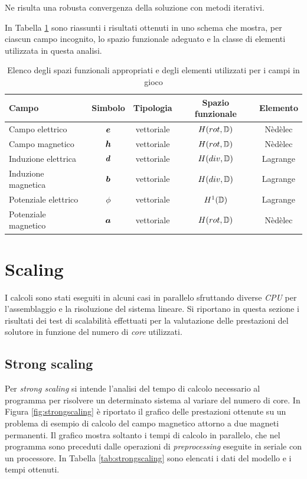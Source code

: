 Ne risulta una robusta convergenza della soluzione con metodi iterativi.


In Tabella \ref{tab:tabella_campi} sono riassunti i risultati ottenuti in uno schema che mostra, per ciascun campo incognito, lo spazio funzionale adeguato e la classe di elementi utilizzata in questa analisi.

\begin{table}[h]
\centering
\caption{Elenco degli spazi funzionali appropriati e degli elementi utilizzati per i campi in gioco}
\footnotesize
\label{tab:tabella_campi}
\begin{tabular}{lcccc}
\toprule
Campo & Simbolo &Tipologia & Spazio funzionale & Elemento\\
\midrule
Campo elettrico & $\boldsymbol{e}$ & vettoriale & $H(rot,\mathbb{D})$ & Nèdèlec\\
Campo magnetico & $\boldsymbol{h}$ & vettoriale & $H(rot,\mathbb{D})$ & Nèdèlec\\
Induzione elettrica & $\boldsymbol{d}$ & vettoriale & $H(div,\mathbb{D})$ & Lagrange\\
Induzione magnetica & $\boldsymbol{b}$ & vettoriale & $H(div,\mathbb{D})$ & Lagrange\\
Potenziale elettrico & $\phi$ & vettoriale & $H^1(\mathbb{D})$ & Lagrange\\
Potenziale magnetico & $\boldsymbol{a}$ & vettoriale & $H(rot,\mathbb{D})$ & Nèdèlec\\
\bottomrule
\end{tabular}
\end{table}

\section{Scaling}
I calcoli sono stati eseguiti in alcuni casi in parallelo sfruttando diverse \textit{CPU} per l'assemblaggio e la risoluzione del sistema lineare. Si riportano in questa sezione i risultati dei test di scalabilità effettuati per la valutazione delle prestazioni del solutore in funzione del numero di \textit{core} utilizzati.

\subsection{Strong scaling}
Per \textit{strong scaling} si intende l'analisi del tempo di calcolo necessario al programma per risolvere un determinato sistema al variare del numero di core. In Figura \ref{fig:strongscaling} è riportato il grafico delle prestazioni ottenute su un problema di esempio di calcolo del campo magnetico attorno a due magneti permanenti. Il grafico mostra soltanto i tempi di calcolo in parallelo, che nel programma sono preceduti dalle operazioni di \textit{preprocessing} eseguite in seriale con un processore. In Tabella \ref{tab:strongscaling} sono elencati i dati del modello e i tempi ottenuti.

